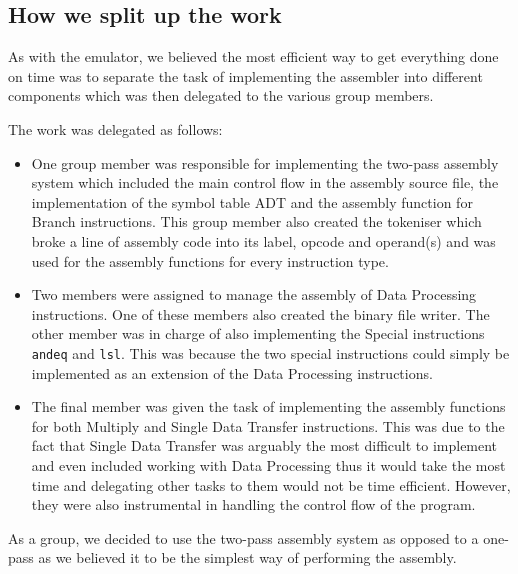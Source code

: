 \documentclass[11pt]{article}
\begin{document}
\subsection{How we split up the work}
As with the emulator, we believed the most efficient way to get everything done on time was to separate the task of implementing the assembler into different components which was then delegated to the various group members.
\par
The work was delegated as follows:
\begin{itemize}
    \item One group member was responsible for implementing the two-pass assembly system which included the main control flow in the assembly source file, the implementation of the symbol table ADT and the assembly function for Branch instructions. This group member also created the tokeniser which broke a line of assembly code into its label, opcode and operand(s) and was used for the assembly functions for every instruction type.
    \item Two members were assigned to manage the assembly of Data Processing instructions. One of these members also created the binary file writer. The other member was in charge of also implementing the Special instructions \texttt{andeq} and \texttt{lsl}. This was because the two special instructions could simply be implemented as an extension of the Data Processing instructions.
    \item The final member was given the task of implementing the assembly functions for both Multiply and Single Data Transfer instructions. This was due to the fact that Single Data Transfer was arguably the most difficult to implement and even included working with Data Processing thus it would take the most time and delegating other tasks to them would not be time efficient. However, they were also instrumental in handling the control flow of the program.
\end{itemize}
As a group, we decided to use the two-pass assembly system as opposed to a one-pass as we believed it to be the simplest way of performing the assembly.
\end{document}

